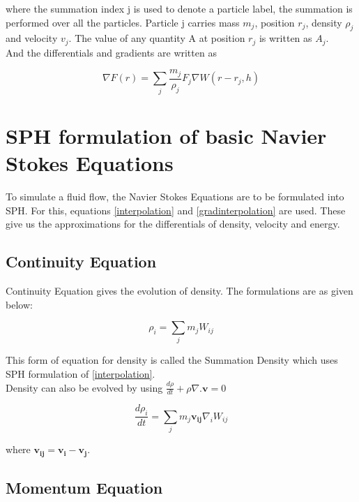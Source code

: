 \noindent
where the summation index j is used to denote a particle label, the summation is performed over all the particles. Particle j carries mass $m_j$, position $r_j$, density $\rho_j$ and velocity $v_j$. The value of any quantity A at position $r_j$ is written as $A_j$. \\

\noindent
And the differentials and gradients are written as 

\begin{equation}
 \nabla F(r) = \sum_j \frac{m_j}{\rho_j}F_j \nabla W(r-r_j, h)
  \label{gradinterpolation}
 \end{equation}


\section{SPH formulation of basic Navier Stokes Equations}

To simulate a fluid flow, the Navier Stokes Equations are to be 
formulated into SPH. For this, equations \ref{interpolation} and \ref{gradinterpolation}
are used. These give us the approximations for the differentials of density, velocity and energy.

\subsection{Continuity Equation}

Continuity Equation gives the evolution of density. The formulations
are as given below:

\begin{equation}
 \rho_i = \sum_j m_j W_{ij}
 \label{summation}
\end{equation}

This form of equation for density is called the Summation Density
which uses SPH formulation of \ref{interpolation}. \\

\noindent
Density can also be evolved by using $\frac{d\rho}{dt} + \rho \nabla . \mathbf{v} = 0$

\begin{equation}
 \frac{d\rho_i}{dt} = \sum_j m_j \mathbf{v_{ij}} \nabla_i W_{ij}
  \label{Continuity}
 \end{equation}

where $\mathbf{v_{ij}} = \mathbf{v_i} - \mathbf{v_j}$.\\


\subsection{Momentum Equation}

